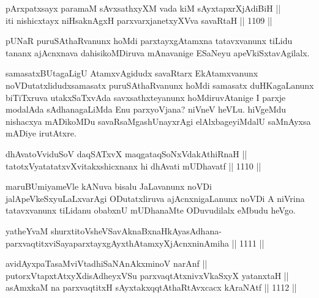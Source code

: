 \begin{shl}
pArxpatxsayx paramaM sAvxsathxyXM vada kiM sAyxtapxrXjAdiBiH || \\
iti nishicxtayx niHsaknAgxH parxvarxjanetxyXVva savaRtaH ||  1109 ||  
\end{shl}

\begin{artha}
pUNaR puruSAthaRvanunx hoMdi parxtayxgAtamxna tatavxvanunx tiLidu tananx ajAcnxnava dahisikoMDiruva mAnavanige ESaNeyu apeVkiSxtavAgilalx.
\end{artha}

\begin{artha}
samasatxBUtagaLigU AtamxvAgidudx savaRtarx EkAtamxvanunx noVDutatxlidudxsamasatx puruSAthaRvanunx hoMdi samasatx duHKagaLanunx biTiTxruva utakxSaTxvAda savxsathxteyanunx hoMdiruvAtanige I parxje modalAda sAdhanagaLiMda Enu parxyoVjana? niVneV heVLu. hiVgeMdu nishacxya mADikoMDu savaRsaMgashUnayxrAgi elAlxbageyiMdalU saMnAyxsa mADiye irutAtxre.
\end{artha}


\begin{shl}
dhAvatoV\s viduSoV daqSATxvX maqgataqSoNxVdakAthiRnaH || \\
tatotxVyatatatxvXvitakxshicxnanx hi dhAvati mUDhavatf ||  1110 ||  
\end{shl}

\begin{artha}
maruBUmiyameVle kANuva bisalu JaLavanunx noVDi jalApeVkeSxyuLaLxvarAgi ODutatxliruva ajAcnxnigaLanunx noVDi A niVrina tatavxvanunx tiLidanu obabxnU mUDhanaMte ODuvudilalx eMbudu heVgo.
\end{artha}


\begin{shl}
yatheYvaM shurxtitoV\s sheVSavAknaBxnaHkAyasAdhana-\\
parxvaqtitxviSayaparxtayxgAyxthAtamxyXjAcnxninAmiha ||  1111 ||  
\end{shl}
				
\begin{shl}
avidAyxpaTasaMviVtadhiSaNAnAkxminoV narAnf ||  \\
putorxVtapxtAtxyXdisAdheyxVSu parxvaqtAtxnivxVkaSxyX yatanxtaH || \\
asAmxkaM na parxvaqtitxH sAyxtakxqqtAthaRtAvxcacx kAraNAtf ||  1112 ||  
\end{shl}

